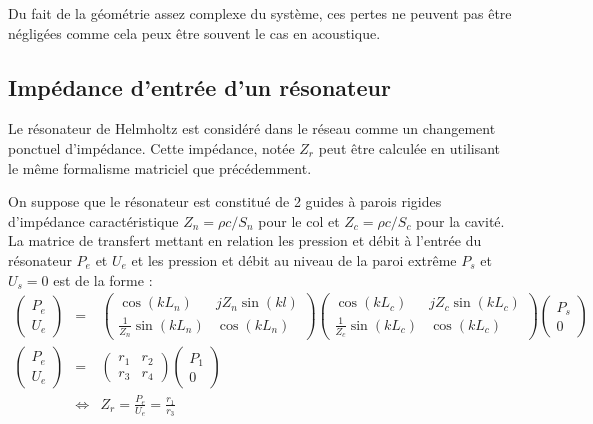 Du fait de la géométrie assez complexe du système, ces pertes ne peuvent pas être négligées comme cela peux être souvent le cas en acoustique.

\subsection{Impédance d'entrée d'un résonateur}
Le résonateur de Helmholtz est considéré dans le réseau comme un changement ponctuel d'impédance. Cette impédance, notée $Z_{r}$ peut être calculée en utilisant le même formalisme matriciel que précédemment.




On suppose que le résonateur est constitué de 2 guides à parois rigides d'impédance caractéristique $Z_{n}=\rho c/S_{n}$ pour le col et $Z_{c}=\rho c /S_{c}$ pour la cavité. La matrice de transfert mettant en relation les pression et débit à l'entrée du résonateur $P_e$ et $U_e$ et les pression et débit au niveau de la paroi extrême $P_s$ et $U_s=0$ est de la forme :
\begin{eqnarray*}
\begin{pmatrix} P_e \\U_e \end{pmatrix} & = & \begin{pmatrix} \cos(k L_n) & j Z_{n} \sin(k l) \\ \frac{1}{Z_{n}} \sin(k L_n) & \cos(k L_n) \end{pmatrix} \begin{pmatrix} \cos(k L_c) & j Z_{c} \sin(k L_c) \\ \frac{1}{Z_{c}} \sin(k L_c) & \cos(k L_c) \end{pmatrix} \begin{pmatrix} P_s \\ 0  \end{pmatrix} \\
\begin{pmatrix} P_e \\U_e \end{pmatrix} & = & \begin{pmatrix} r_1 & r_2 \\ r_3 & r_4 \end{pmatrix} \begin{pmatrix} P_1 \\ 0  \end{pmatrix} \\
~ & \Leftrightarrow & Z_{r}	 = \frac{P_e}{U_e}= \frac{r_1}{r_3}
\end{eqnarray*}


